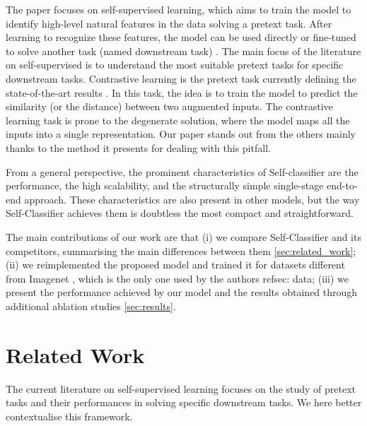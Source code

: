 \documentclass{article}
\begin{document}
The paper focuses on self-supervised learning, which aims to train the model to identify high-level natural features in the data solving a pretext task.
After learning to recognize these features, the model can be used directly or fine-tuned to solve another task (named downstream task) \cite{self_classifier}\cite{swav} \cite{simsiam}\cite{byol}.
The main focus of the literature on self-supervised is to understand the most suitable pretext tasks for specific downstream tasks.
Contrastive learning is the pretext task currently defining the state-of-the-art results \cite{byol}\cite{simclr}. In this task, the idea is to train the model to predict the similarity (or the distance) between two augmented inputs. 
The contrastive learning task is prone to the degenerate solution, where the model maps all the inputs into a single representation. Our paper stands out from the others mainly thanks to the method it presents for dealing with this pitfall.

From a general perspective, the prominent characteristics of Self-classifier are the performance, the high scalability, and the structurally simple single-stage end-to-end approach. These characteristics are also present in other models, but the way Self-Classifier achieves them is doubtless the most compact and straightforward. 

The main contributions of our work are that (i) we compare Self-Classifier and its competitors, summarising the main differences between them \autoref{sec:related_work}; (ii) we reimplemented the proposed model and trained it for datasets different from Imagenet \cite{imagenet}, which is the only one used by the authors ref{sec: data}; (iii) we present the performance achieved by our model and the results obtained through additional ablation studies \autoref{sec:results}.

\section{Related Work}
\label{sec:related_work}
The current literature on self-supervised learning focuses on the study of pretext tasks and their performances in solving specific downstream tasks. We here better contextualise this framework.
\end{document}

